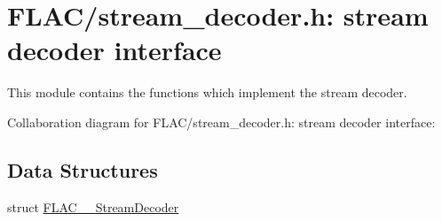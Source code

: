 \hypertarget{group__flac__stream__decoder}{}\section{F\+L\+A\+C/stream\+\_\+decoder.h\+: stream decoder interface}
\label{group__flac__stream__decoder}


This module contains the functions which implement the stream decoder.  


Collaboration diagram for F\+L\+A\+C/stream\+\_\+decoder.h\+: stream decoder interface\+:
\subsection*{Data Structures}
\begin{DoxyCompactItemize}
\item 
struct \hyperlink{struct_f_l_a_c_____stream_decoder}{F\+L\+A\+C\+\_\+\+\_\+\+Stream\+Decoder}
\end{DoxyCompactItemize}

